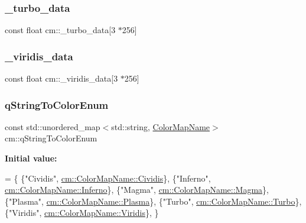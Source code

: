 \mbox{\label{namespacecm_a1394411b557deb7b6f8c58a9c39ff4a3}} 
\subsubsection{\texorpdfstring{\+\_\+turbo\+\_\+data}{\_turbo\_data}}
{\footnotesize\ttfamily const float cm\+::\+\_\+turbo\+\_\+data\mbox{[}3 $\ast$256\mbox{]}}

\mbox{\label{namespacecm_af931122787ac6cf5d5c8d834adcb3fc8}} 
\subsubsection{\texorpdfstring{\+\_\+viridis\+\_\+data}{\_viridis\_data}}
{\footnotesize\ttfamily const float cm\+::\+\_\+viridis\+\_\+data\mbox{[}3 $\ast$256\mbox{]}}

\mbox{\label{namespacecm_a15083c75e20e3cb25b34ac29a4d66413}} 
\subsubsection{\texorpdfstring{q\+String\+To\+Color\+Enum}{qStringToColorEnum}}
{\footnotesize\ttfamily const std\+::unordered\+\_\+map$<$std\+::string, \hyperlink{namespacecm_aabaf84796e8a93bd6adca4c5bdea5311}{Color\+Map\+Name}$>$ cm\+::q\+String\+To\+Color\+Enum}

{\bfseries Initial value\+:}
\begin{DoxyCode}
= \{
    \{\textcolor{stringliteral}{"Cividis"}, \hyperlink{namespacecm_aabaf84796e8a93bd6adca4c5bdea5311a64c2ad47aeb457c258518a5318ed071d}{cm::ColorMapName::Cividis}\},
    \{\textcolor{stringliteral}{"Inferno"}, \hyperlink{namespacecm_aabaf84796e8a93bd6adca4c5bdea5311a8bb279f735c1d9c831e935cca2613b58}{cm::ColorMapName::Inferno}\},
    \{\textcolor{stringliteral}{"Magma"}, \hyperlink{namespacecm_aabaf84796e8a93bd6adca4c5bdea5311a1b62e99f86d45e754e5e79d9fa9dfcde}{cm::ColorMapName::Magma}\},
    \{\textcolor{stringliteral}{"Plasma"}, \hyperlink{namespacecm_aabaf84796e8a93bd6adca4c5bdea5311ab20a4217acaf4316739c6a5f6679ef60}{cm::ColorMapName::Plasma}\},
    \{\textcolor{stringliteral}{"Turbo"}, \hyperlink{namespacecm_aabaf84796e8a93bd6adca4c5bdea5311a6f53bfe04e78da893ba0c4f35ba6847e}{cm::ColorMapName::Turbo}\},
    \{\textcolor{stringliteral}{"Viridis"}, \hyperlink{namespacecm_aabaf84796e8a93bd6adca4c5bdea5311a951ee92ee5e947e1e7e1cb6376523c1a}{cm::ColorMapName::Viridis}\},
\}
\end{DoxyCode}

